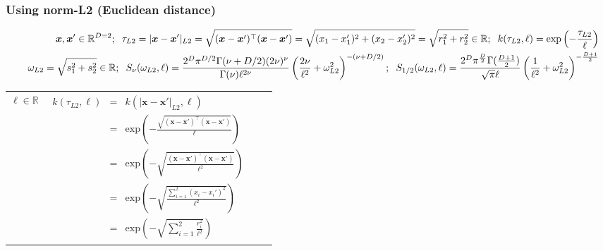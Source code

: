 \documentclass[]{interact}
\theoremstyle{plain}%
\theoremstyle{definition}
\theoremstyle{remark}
\begin{document}
\begin{landscape}
\subsubsection{Using norm-L2 (Euclidean distance)}
\vspace{-8mm}

\begin{table}[H]
\small
\begin{eqnarray*}
\vspace{-20mm}
&&\bm{x}, \bm{x}' \in \mathbb{R}^{D=2}; \hspace{2mm}\tau_{L2} =|\bm{x}-\bm{x}'|_{L2} = \sqrt{(\bm{x}-\bm{x}')^\top(\bm{x}-\bm{x}')} = \sqrt{(x_1-x_1')^2+(x_2-x_2')^2}  = \sqrt{r_1^2+r_2^2} \in \mathbb{R}; \hspace{2mm} k(\tau_{L2},\ell) = \mathrm{exp}\left(- \frac{\tau_{L2}}{\ell} \right)\\
&& \omega_{L2}= \sqrt{s_1^2+s_2^2} \in \mathbb{R}; \hspace{2mm} S_{\nu}(\omega_{L2},\ell) = \frac{2^D\pi^{D/2}\Gamma(\nu+D/2)(2\nu)^{\nu}}{\Gamma(\nu)\ell^{2\nu}}\left(\frac{2\nu}{\ell^2}+\omega_{L2}^2 \right)^{-(\nu+D/2)}; \hspace{2mm} S_{1/2}(\omega_{L2},\ell) = \frac{2^D\pi^{\frac{D}{2}}\Gamma(\frac{D+1}{2})}{\sqrt{\pi}\ell}\left(\frac{1}{\ell^2}+\omega_{L2}^2 \right)^{-\frac{D+1}{2}}
\end{eqnarray*}
\normalsize
  \begin{center}
    \begin{tabular}{|c|c|c|c|}
       \hline
       
       \multicolumn{1}{|p{1.5cm}|}{
       \vspace{1mm}
       $\ell \in \mathbb{R}$
       }
       
        & \multicolumn{1}{|p{7.2cm}|}{\small
         \begin{eqnarray*}
		k(\tau_{L2},\ell) &=& k(|\bm{x}-\bm{x}'|_{L2},\ell)\\
		 &=& \mathrm{exp}\left(- \frac{\sqrt{(\bm{x}-\bm{x}')^\top(\bm{x}-\bm{x}')}}{\ell} \right)\\
		&=& \mathrm{exp}\left(- \sqrt{\frac{(\bm{x}-\bm{x}')^\top(\bm{x}-\bm{x}')}{\ell^2}} \right)\\
		&=& \mathrm{exp}\left(- \sqrt{\frac{\sum_{i=1}^{2}(x_i-x_i')^2}{\ell^2}} \right) \\
		&=& \mathrm{exp}\left(-\sqrt{ \sum_{i=1}^{2}\frac{r_i^2}{\ell^2}} \right)
         \end{eqnarray*}
       }
       

\end{tabular}
\end{center}
\end{table}
\end{landscape}
\end{document}
